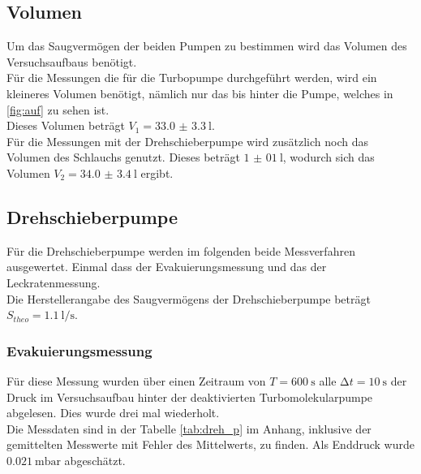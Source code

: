       \subsection{Volumen}
        Um das Saugvermögen der beiden Pumpen zu bestimmen wird das Volumen des Versuchsaufbaus benötigt.\\
        Für die Messungen die für die Turbopumpe durchgeführt werden, wird ein kleineres Volumen benötigt, nämlich nur das bis hinter die Pumpe, 
        welches in \ref{fig:auf} zu sehen ist.\\
        Dieses Volumen beträgt $V_1 = \SI{33.0(33)}{\litre}$.\\
        Für die Messungen mit der Drehschieberpumpe wird zusätzlich noch das Volumen des Schlauchs genutzt. 
        Dieses beträgt $\SI{1(01)}{\litre}$, wodurch sich das Volumen $V_2 = \SI{34.0(34)}{\litre}$ ergibt.\\



      \subsection{Drehschieberpumpe}

        \noindent Für die Drehschieberpumpe werden im folgenden beide Messverfahren ausgewertet. Einmal dass der Evakuierungsmessung und das der Leckratenmessung.\\
        Die Herstellerangabe des Saugvermögens der Drehschieberpumpe beträgt $ S_{theo} = \SI{1.1}{\litre\per\second}$.

        \subsubsection{Evakuierungsmessung}

        \noindent Für diese Messung wurden über einen Zeitraum von $ T = \SI{600}{\second}$ alle $ \increment t = \SI{10}{\second}$
        der Druck im Versuchsaufbau hinter der deaktivierten Turbomolekularpumpe abgelesen. Dies wurde drei mal wiederholt.\\
        Die Messdaten sind in der Tabelle \ref{tab:dreh_p} im Anhang, inklusive der gemittelten Messwerte mit Fehler des Mittelwerts, zu finden.
        Als Enddruck wurde $\SI{0.021}{\milli\bar}$ abgeschätzt.\\\\
        
